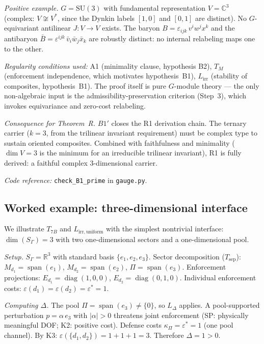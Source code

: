 \documentclass[11pt,a4paper]{article}
\theoremstyle{definition}
\newcommand{\eps}{\varepsilon}
\newcommand{\SU}{\mathrm{SU}}
\DeclareMathOperator{\spn}{span}
\DeclareMathOperator{\diag}{diag}
\newcommand{\coderef}[2]{\smallskip\noindent\textit{Code reference:} \texttt{#1} in \texttt{#2}.}
\begin{document}
\smallskip\noindent\textit{Positive example.}\quad
$G = \SU(3)$ with fundamental representation $V = \mathbb{C}^3$
(complex: $V \not\cong V^*$, since the Dynkin labels $[1,0]$ and
$[0,1]$ are distinct).  No $G$-equivariant antilinear $J: V \to V$ exists.
The baryon $B = \varepsilon_{ijk}\, v^i w^j x^k$ and the antibaryon
$\bar{B} = \varepsilon^{ijk}\, \bar{v}_i \bar{w}_j \bar{x}_k$ are
robustly distinct: no internal relabeling maps one to the other.

\smallskip\noindent\textit{Regularity conditions used:}
A1 (minimality clause, hypothesis B2), $T_M$ (enforcement independence,
which motivates hypothesis~B1), $L_{\mathrm{irr}}$ (stability of composites,
hypothesis~B1).  The proof itself is pure $G$-module theory --- the only
non-algebraic input is the admissibility-preservation criterion (Step~3),
which invokes equivariance and zero-cost relabeling.

\smallskip\noindent\textit{Consequence for Theorem~R.}\quad
$B1'$ closes the R1 derivation chain.  The ternary carrier ($k = 3$, from
the trilinear invariant requirement) must be complex type to sustain
oriented composites.  Combined with faithfulness and minimality
($\dim V = 3$ is the minimum for an irreducible trilinear invariant),
R1 is fully derived: a faithful complex 3-dimensional carrier.

\coderef{check\_B1\_prime}{gauge.py}


\subsection{Worked example: three-dimensional interface}
\label{sec:worked_example}

We illustrate $T_{7B}$ and $L_{\mathrm{irr,uniform}}$ with the simplest
nontrivial interface: $\dim(S_\Gamma) = 3$ with two one-dimensional
sectors and a one-dimensional pool.

\smallskip\noindent\textit{Setup.}\quad
$S_\Gamma = \mathbb{R}^3$ with standard basis $\{e_1, e_2, e_3\}$.
Sector decomposition ($T_{\mathrm{sep}}$):
$M_{d_1} = \spn(e_1)$, $M_{d_2} = \spn(e_2)$, $\Pi = \spn(e_3)$.
Enforcement projections:
$E_{d_1} = \diag(1,0,0)$, $E_{d_2} = \diag(0,1,0)$.
Individual enforcement costs: $\eps(d_1) = \eps(d_2) = \eps^* = 1$.

\smallskip\noindent\textit{Computing $\Delta$.}\quad
The pool $\Pi = \spn(e_3) \ne \{0\}$, so $L_\Delta$ applies.
A pool-supported perturbation $p = \alpha\, e_3$ with $|\alpha| > 0$
threatens joint enforcement (SP: physically meaningful DOF;
K2: positive cost).  Defense costs $\kappa_\Pi = \eps^* = 1$ (one pool
channel).  By K3: $\eps(\{d_1, d_2\}) = 1 + 1 + 1 = 3$.
Therefore $\Delta = 1 > 0$.
\end{document}
